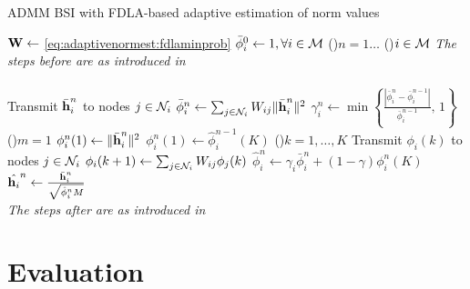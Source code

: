 \documentclass{article}
\begin{document}
\begin{algorithm}[t]
    \caption{ADMM BSI with FDLA-based adaptive estimation of norm values}\label{alg:davg_norm_est}
    \(\bm{\mathrm{W}} \gets\) \eqref{eq:adaptivenormest:fdlaminprob}\;
    \(\bar{\phi}_i^{0} \gets 1, \forall i \in \mathcal{M}\)\;
    \For(){\(n=1\dots\)}
    {
        \For(){\(i \in \mathcal{M}\)}
        {
            \emph{The steps before are as introduced in }\cite{blochbergerDBSI}\\
            \dotfill\\
            Transmit \(\bar{\bm{\mathrm{h}}}_i^{n}\) to nodes  \(j \in \mathcal{N}_i\)\;
            \(\bar{\phi}_i^{n} \gets \sum_{j \in \mathcal{N}_i} W_{ij} \|\bar{\bm{\mathrm{h}}}_i^n\|^2\)\;
            \(\gamma_i^{n} \gets \min \left\lbrace \frac{| \bar{\phi}_i^{n} - \bar{\phi}_i^{n-1} |}{\bar{\phi}_i^{n-1}},\,1\right\rbrace\)\;
            \eIf(){\(m = 1\)}
            {
                \(\phi_i^{n}(1) \gets \|\bar{\bm{\mathrm{h}}}_i^n\|^2\)\;
            }
            {
                \(\phi_i^{n}(1) \gets \hat{\phi}_i^{n-1}(K)\)\;
            }
            \For(){\(k=1,\dots,K\)}
            {
                Transmit \(\phi_i(k)\) to nodes  \(j \in \mathcal{N}_i\)\;
                \(\phi_i({k+1}) \gets \sum_{j \in \mathcal{N}_i} W_{ij} \phi_j({k})\)\;
            }
            \(\hat{\phi}_i^{n} \gets \gamma_i \bar{\phi}_i^{n} + (1-\gamma) \phi_i^{n}(K)\)\;
            \(\hat{\bm{\mathrm{h}}_i}^{n} \gets \frac{\bar{\bm{\mathrm{h}}}_i^{n}}{\sqrt{\hat{\phi}_i^{n}M}}\)\;
            \dotfill\\
            \emph{The steps after are as introduced in }\cite{blochbergerDBSI}\\
        }
    }
\end{algorithm}



\section{Evaluation}
\label{sec:simulations}
\end{document}
